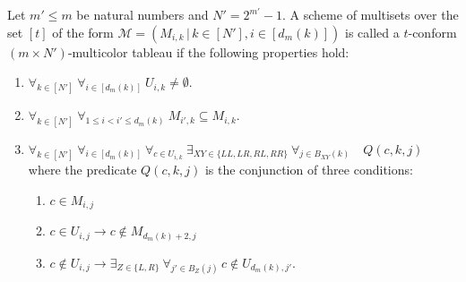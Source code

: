 \documentclass[a4paper,USenglish,numberwithinsect]{lipics}
\theoremstyle{plain}
\begin{document}
\noindent
\begin{definition}
\label{t-admis}
Let  $m' \leq m$ be natural numbers and $N'=2^{m'}-1$.
A scheme of  multisets over the set $[t ]$ of the form
${\mathcal M}=\left(M_{i,k} \, | \, k \in [N'],  i \in [d_m(k)] \right)$
is called a  
$t$-conform $(m \times N')$-multicolor tableau
if the following properties hold:
\begin{enumerate}
\item $\forall_{ k \in [N']} \ \forall_{   i \in [d_m(k)]} \ U_{i,k} \not=
\emptyset$.
\item $\forall_{ k \in [N']} \ \forall_{  1 \leq i < i'  \leq d_m(k)} \
M_{i',k} \subseteq M_{i,k}$.
\item $\forall_{ k \in [N']}\ \forall_{   i \in [d_m(k)]} \ \forall_{  c \in
U_{i,k}} \
\exists_{ XY \in \{LL,LR,RL,RR\}} \ \forall_{ j \in B_{XY}(k)} \quad Q(c,k,j)$ \\
where the predicate  $Q(c,k,j) $ is the conjunction of 
three conditions:
\begin{enumerate}
\item $c \in M_{i,j}$
\item  $c \in U_{i,j} \rightarrow  c \not \in M_{d_m(k)+2,j}$  
\item $ c \not \in U_{i,j} \rightarrow \exists_{ Z \in \{L,R\}} \ \forall_
{j' \in B_Z(j)}\, c \not \in U_{d_m(k),j'}$.
\end{enumerate}
\end{enumerate}
\end{definition}
\end{document}
